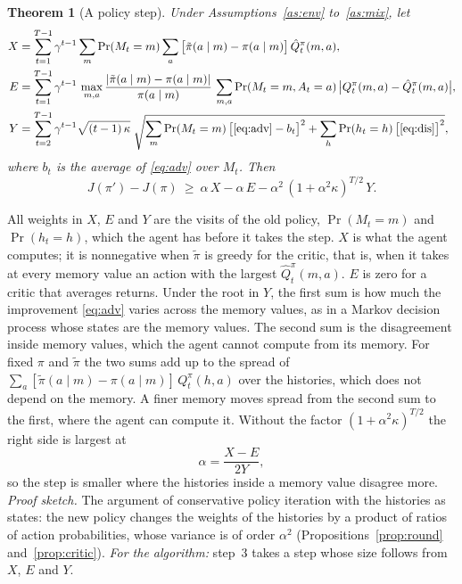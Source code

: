 \documentclass{article}
\newtheorem{theorem}{Theorem}
\newcounter{algo}
\theoremstyle{definition}
\begin{document}
\begin{theorem}[A policy step]\label{thm:step}
Under Assumptions~\ref{as:env} to~\ref{as:mix}, let
\begin{align*}
X&=\sum_{t=1}^{T-1}\gamma^{t-1}\sum_m\Pr(M_t=m)\sum_a\big[\tilde\pi(a\mid m)-\pi(a\mid m)\big]\,\hat Q^\pi_t(m,a),\\
E&=\sum_{t=1}^{T-1}\gamma^{t-1}\,\max_{m,a}\frac{|\tilde\pi(a\mid m)-\pi(a\mid m)|}{\pi(a\mid m)}\,\sum_{m,a}\Pr(M_t=m,A_t=a)\,\big|Q^\pi_t(m,a)-\hat Q^\pi_t(m,a)\big|,\\
Y&=\sum_{t=2}^{T-1}\gamma^{t-1}\sqrt{(t-1)\,\kappa}\;\sqrt{\sum_m\Pr(M_t=m)\,\big[\eqref{eq:adv}-b_t\big]^2+\sum_h\Pr(h_t=h)\,\big[\eqref{eq:dis}\big]^2},
\end{align*}
where $b_t$ is the average of \eqref{eq:adv} over $M_t$. Then
\[
J(\pi')-J(\pi)\ \ge\ \alpha\,X-\alpha\,E-\alpha^2\,(1+\alpha^2\kappa)^{T/2}\,Y.
\]
\end{theorem}

All weights in $X$, $E$ and $Y$ are the visits of the old policy, $\Pr(M_t=m)$ and $\Pr(h_t=h)$, which the agent has before it takes the step. $X$ is what the agent computes; it is nonnegative when $\tilde\pi$ is greedy for the critic, that is, when it takes at every memory value an action with the largest $\hat Q^\pi_t(m,a)$. $E$ is zero for a critic that averages returns. Under the root in $Y$, the first sum is how much the improvement \eqref{eq:adv} varies across the memory values, as in a Markov decision process whose states are the memory values. The second sum is the disagreement inside memory values, which the agent cannot compute from its memory. For fixed $\pi$ and $\tilde\pi$ the two sums add up to the spread of $\sum_a[\tilde\pi(a\mid m)-\pi(a\mid m)]\,Q^\pi_t(h,a)$ over the histories, which does not depend on the memory. A finer memory moves spread from the second sum to the first, where the agent can compute it. Without the factor $(1+\alpha^2\kappa)^{T/2}$ the right side is largest at
\[
\alpha=\frac{X-E}{2Y},
\]
so the step is smaller where the histories inside a memory value disagree more. \emph{Proof sketch.} The argument of conservative policy iteration with the histories as states: the new policy changes the weights of the histories by a product of ratios of action probabilities, whose variance is of order $\alpha^2$ (Propositions~\ref{prop:round} and~\ref{prop:critic}). \emph{For the algorithm:} step~3 takes a step whose size follows from $X$, $E$ and $Y$.
\end{document}
